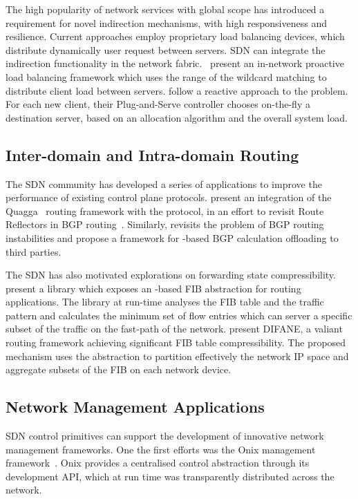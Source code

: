 The high popularity of network services with global scope has introduced a
requirement for novel indirection mechanisms, with high responsiveness and
resilience. Current approaches employ proprietary load balancing devices, which
distribute dynamically user request between servers.  SDN can integrate the
indirection functionality in the network fabric. ~present an
in-network proactive load balancing framework which uses the range of the \of
wildcard matching to distribute client load between servers.
 follow a reactive approach to the problem. For
each new client, their Plug-and-Serve controller chooses on-the-fly a
destination server, based on an allocation algorithm and the overall system
load.

\subsection{Inter-domain and Intra-domain Routing}

The SDN community has developed a series of applications to improve the performance
of existing control plane protocols.   present an integration
of the Quagga~ routing framework with the \of protocol, in an
effort to revisit Route Reflectors in BGP routing~. Similarly,
 revisits the problem of BGP routing instabilities and propose a
framework for \of-based BGP calculation offloading to third parties.

The SDN has also motivated explorations on forwarding state compressibility.
 present a library which exposes an \of-based FIB abstraction
for routing applications.  The library at run-time analyses the FIB table and
the traffic pattern and calculates the minimum set of flow entries which can
server a specific subset of the traffic on the fast-path of the network.
 present DIFANE, a valiant routing framework achieving significant
FIB table compressibility.  The proposed mechanism uses the \of abstraction to
partition effectively the network IP space and aggregate subsets of the FIB on
each network device. 

\subsection{Network Management Applications}

SDN control primitives can support the development of innovative network
management frameworks. One the first efforts was the Onix management
framework~. Onix provides a centralised control abstraction
through its development API, which at run time was transparently distributed
across the network. 


